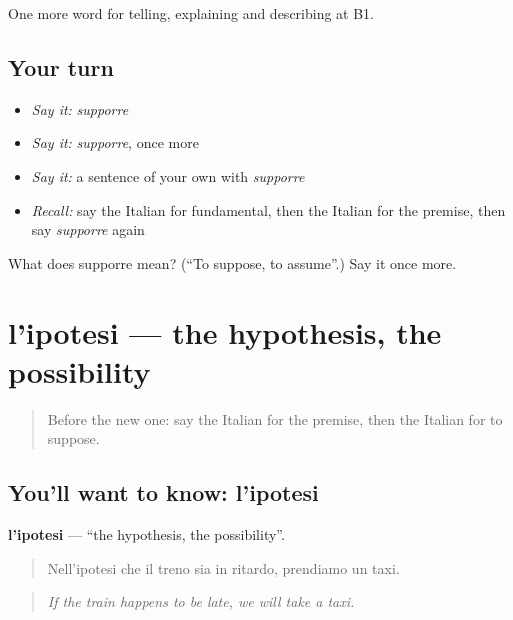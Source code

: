 \begin{grammarlens}[title={What you've built}]
One more word for telling, explaining and describing at B1.
\end{grammarlens}

\subsection*{Your turn}
\begin{itemize}
\raggedright
  \item \emph{Say it:} \emph{supporre}
  \item \emph{Say it:} \emph{supporre}, once more
  \item \emph{Say it:} a sentence of your own with \emph{supporre}
  \item \emph{Recall:} say the Italian for fundamental, then the Italian for the premise, then say \emph{supporre} again
\end{itemize}

\begin{tcolorbox}[breakable,colback=teal!4,colframe=teal!35!black,title={Before you move on}]
What does supporre mean? (\textquotedblleft{}To suppose, to assume\textquotedblright{}.) Say it once more.
\end{tcolorbox}
\section[l'ipotesi]{l'ipotesi — the hypothesis, the possibility}

\label{lesson:IT-C372-ipotesi}



\begin{quote}
Before the new one: say the Italian for the premise, then the Italian for to suppose.
\end{quote}

\subsection*{You'll want to know: l'ipotesi}
\textbf{l'ipotesi} — \textquotedblleft{}the hypothesis, the possibility\textquotedblright{}.

\begin{quote}
Nell'ipotesi che il treno sia in ritardo, prendiamo un taxi.
\end{quote}

\begin{quote}
\emph{If the train happens to be late, we will take a taxi.}
\end{quote}

